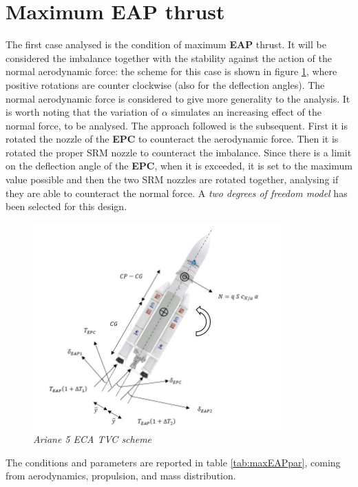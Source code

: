 \documentclass[12pt,fleqn,openany]{book} %
\begin{document}
\section{Maximum EAP thrust}
The first case analysed is the condition of maximum \textbf{EAP} thrust. It will be considered the imbalance together with the stability against the action of the normal aerodynamic force: the scheme for this case is shown in figure \hypertarget{fig:A5sch}{\ref{fig:A5sch}}, where positive rotations are counter clockwise (also for the deflection angles). The normal aerodynamic force is considered to give more generality to the analysis. It is worth noting that the variation of $\alpha$ simulates an increasing effect of the normal force, to be analysed. The approach followed is the subsequent. First it is rotated the nozzle of the \textbf{EPC} to counteract the aerodynamic force. Then it is rotated the proper SRM nozzle to counteract the imbalance. Since there is a limit on the deflection angle of the \textbf{EPC}, when it is exceeded, it is set to the maximum value possible and then the two SRM nozzles are rotated together, analysing if they are able to counteract the normal force. A \textit{two degrees of freedom model} has been selected for this design. 
\begin{figure}[h]
 \centering
 \includegraphics[width=0.85\textwidth]{TVC}
 \caption{\emph{Ariane 5 ECA TVC scheme}}
 \label{fig:A5sch}
\end{figure}\newpage
\noindent The conditions and parameters are reported in table \hypertarget{tab:maxEAPpar}{\ref{tab:maxEAPpar}}, coming from aerodynamics, propulsion, and mass distribution.
\end{document}
